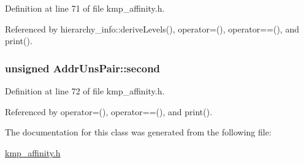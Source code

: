 Definition at line 71 of file kmp\-\_\-affinity.\-h.



Referenced by hierarchy\-\_\-info\-::derive\-Levels(), operator=(), operator==(), and print().

\hypertarget{classAddrUnsPair_afba7fb1f72a6e49d8024dc37c0bacf1a}{
\subsubsection[{second}]{\setlength{\rightskip}{0pt plus 5cm}unsigned Addr\-Uns\-Pair\-::second}}\label{classAddrUnsPair_afba7fb1f72a6e49d8024dc37c0bacf1a}


Definition at line 72 of file kmp\-\_\-affinity.\-h.



Referenced by operator=(), operator==(), and print().



The documentation for this class was generated from the following file\-:\begin{DoxyCompactItemize}
\item 
\hyperlink{kmp__affinity_8h}{kmp\-\_\-affinity.\-h}\end{DoxyCompactItemize}
